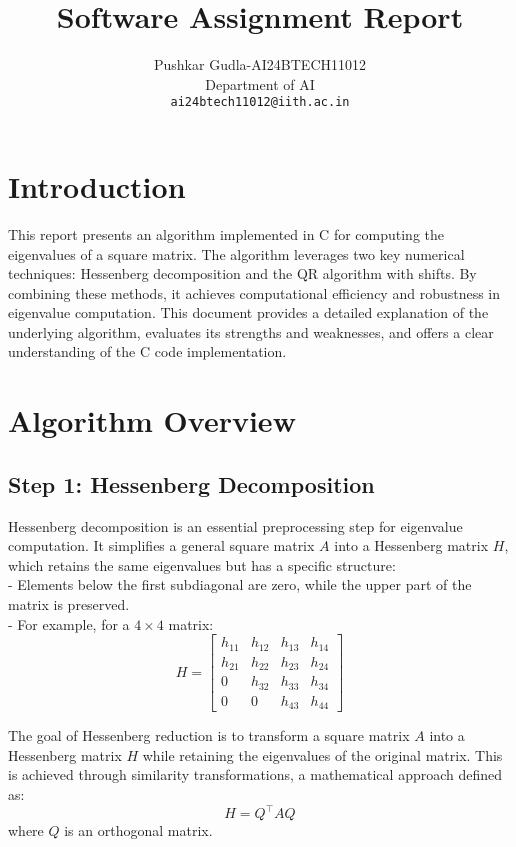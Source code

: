 \documentclass{article}
\title{Software Assignment Report}
\author{
 Pushkar Gudla-AI24BTECH11012 \\
 Department of AI \\
 \texttt{ai24btech11012@iith.ac.in}
 }
\begin{document}
              
\maketitle

\section{ Introduction}
This report presents an algorithm implemented in C for computing the eigenvalues of a square matrix. The algorithm leverages two key numerical techniques: Hessenberg decomposition and the QR algorithm with shifts. By combining these methods, it achieves computational efficiency and robustness in eigenvalue computation. This document provides a detailed explanation of the underlying algorithm, evaluates its strengths and weaknesses, and offers a clear understanding of the C code implementation.

\section{ Algorithm Overview}

\subsection{ Step 1: Hessenberg Decomposition}
Hessenberg decomposition is an essential preprocessing step for eigenvalue computation. It simplifies a general square matrix \( A \) into a Hessenberg matrix \( H \), which retains the same eigenvalues but has a specific structure:\\
- Elements below the first subdiagonal are zero, while the upper part of the matrix is preserved.\\
- For example, for a \( 4 \times 4 \) matrix:\\
  \[
  H = 
  \begin{bmatrix}
  h_{11} & h_{12} & h_{13} & h_{14} \\
  h_{21} & h_{22} & h_{23} & h_{24} \\
  0 & h_{32} & h_{33} & h_{34} \\
  0 & 0 & h_{43} & h_{44}
  \end{bmatrix}
  \]

The goal of Hessenberg reduction is to transform a square matrix $A$ into a Hessenberg matrix $H$ while retaining the eigenvalues of the original matrix. This is achieved through similarity transformations, a mathematical approach defined as:
\[
H = Q^\top AQ
\]
where $Q$ is an orthogonal matrix.
\end{document}
